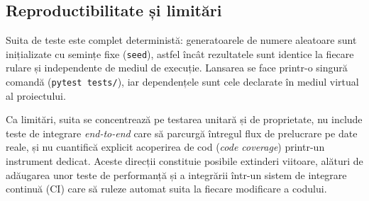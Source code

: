 \subsection{Reproductibilitate și limitări}

Suita de teste este complet deterministă: generatoarele de numere aleatoare sunt
inițializate cu semințe fixe (\texttt{seed}), astfel încât rezultatele sunt
identice la fiecare rulare și independente de mediul de execuție. Lansarea se
face printr-o singură comandă (\texttt{pytest tests/}), iar dependențele sunt
cele declarate în mediul virtual al proiectului.

Ca limitări, suita se concentrează pe testarea unitară și de proprietate, nu
include teste de integrare \emph{end-to-end} care să parcurgă întregul flux de
prelucrare pe date reale, și nu cuantifică explicit acoperirea de cod
(\emph{code coverage}) printr-un instrument dedicat. Aceste direcții constituie
posibile extinderi viitoare, alături de adăugarea unor teste de performanță și a
integrării într-un sistem de integrare continuă (CI) care să ruleze automat
suita la fiecare modificare a codului.
